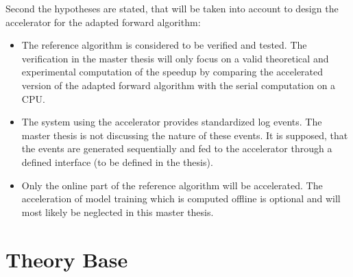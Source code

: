 \documentclass[12pt]{article} %
\begin{document}
Second the hypotheses are stated, that will be taken into account to design the
accelerator for the adapted forward algorithm:
\begin{itemize}
    \item The reference algorithm is considered to be verified and tested. The
        verification in the master thesis will only focus on a valid
        theoretical and experimental computation of the speedup by comparing the
        accelerated version of the adapted forward algorithm with the serial
        computation on a CPU.
    \item The system using the accelerator provides standardized log events.
        The master thesis is not discussing the nature of these events. It is
        supposed, that the events are generated sequentially and fed to the
        accelerator through a defined interface (to be defined in the thesis).
    \item Only the online part of the reference algorithm will be accelerated.
        The acceleration of model training which is computed offline is optional
        and will most likely be neglected in this master thesis.
\end{itemize}


\section{Theory Base} %
\end{document}
